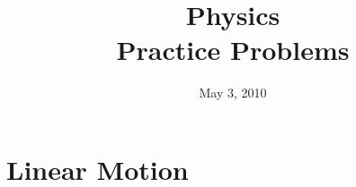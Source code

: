 \documentclass[fleqn,addpoints]{exam}
\title{Physics \\ Practice Problems}
\date{May 3, 2010}
\begin{document}
\maketitle

\section{Linear Motion}
 
\begin{questions}

\question

\end{questions}
\end{document}
